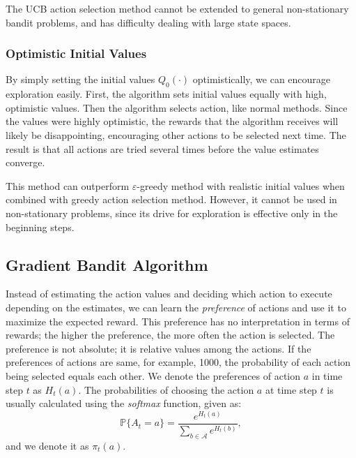 \documentclass[../../main.tex]{subfiles}
\begin{document}
            The UCB action selection method cannot be extended to general non-stationary bandit problems, and has difficulty dealing with large state spaces.

        \subsubsection{Optimistic Initial Values}
            By simply setting the initial values $Q_0(\cdot)$ optimistically, we can encourage exploration easily.
            First, the algorithm sets initial values equally with high, optimistic values. Then the algorithm selects
            action, like normal methods. Since the values were highly optimistic, the rewards that the algorithm receives will likely be disappointing,
            encouraging other actions to be selected next time. The result is that all actions are tried several times before the value estimates converge.

            This method can outperform $\varepsilon$-greedy method with realistic initial values when combined with greedy action selection method.
            However, it cannot be used in non-stationary problems, since its drive for exploration is effective only in the beginning steps.

    \subsection{Gradient Bandit Algorithm}
        Instead of estimating the action values and deciding which action to execute depending on the estimates, we can learn the \emph{preference} of actions and use it to maximize the expected reward.
        This preference has no interpretation in terms of rewards; the higher the preference, the more often the action is selected. The preference is not absolute; it is relative
        values among the actions. If the preferences of actions are same, for example, 1000, the probability of each action being selected equals each other.
        We denote the preferences of action $a$ in time step $t$ as $H_t(a)$. The probabilities of choosing the action $a$ at time step $t$
        is usually calculated using the \emph{softmax} function, given as:
        \begin{equation}\label{eq:GradBanditProb}
        \mathbb{P}\{A_t=a\}=\frac{e^{H_t(a)}}{\sum_{b \in \mathcal{A}}e^{H_t(b)}},
        \end{equation}
        and we denote it as $\pi_t(a)$.
\end{document}
